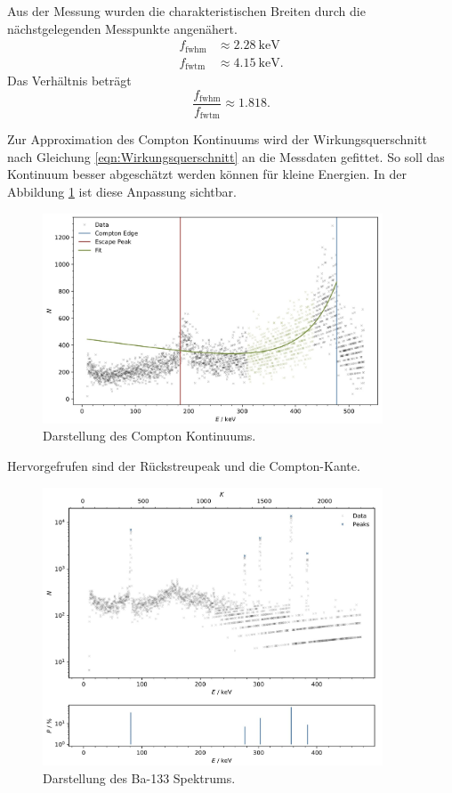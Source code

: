 Aus der Messung wurden die charakteristischen Breiten durch die nächstgelegenden Messpunkte angenähert. 
\begin{align*}
    f_{\text{fwhm}} &\approx \qty{2.28}{\kilo\eV}\\
    f_{\text{fwtm}} &\approx \qty{4.15}{\kilo\eV}.
\end{align*}
Das Verhältnis beträgt
\begin{equation*}
    \frac{f_{\text{fwhm}}}{f_{\text{fwtm}}} \approx \num{1.818}.
\end{equation*}

Zur Approximation des Compton Kontinuums wird der Wirkungsquerschnitt nach Gleichung \ref{eqn:Wirkungsquerschnitt} an die Messdaten gefittet.
So soll das Kontinuum besser abgeschätzt werden können für kleine Energien.
In der Abbildung \ref{fig:plot9} ist diese Anpassung sichtbar.

\begin{figure}[H]
    \centering
    \includegraphics[width=0.9\textwidth]{content/plots/plot9.jpg}
    \caption{Darstellung des Compton Kontinuums.}
    \label{fig:plot9}
\end{figure}

Hervorgefrufen sind der Rückstreupeak und die Compton-Kante.

\begin{figure}[H]
    \centering
    \includegraphics[width=0.9\textwidth]{content/plots/plot10.jpg}
    \caption{Darstellung des Ba-133 Spektrums.}
    \label{fig:plot10}
\end{figure}


